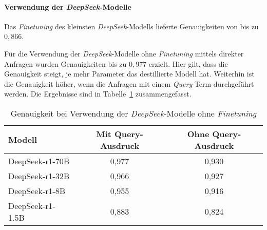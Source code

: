\paragraph{Verwendung der \textit{DeepSeek}-Modelle}
Das \textit{Finetuning} des kleinsten \textit{DeepSeek}-Modells lieferte Genauigkeiten von bis zu $0,866$.

Für die Verwendung der \textit{DeepSeek}-Modelle ohne \textit{Finetuning} mittels direkter Anfragen wurden Genauigkeiten bis zu $0,977$ erzielt.
Hier gilt, dass die Genauigkeit steigt, je mehr Parameter das destillierte Modell hat.
Weiterhin ist die Genauigkeit höher, wenn die Anfragen mit einem \textit{Query}-Term durchgeführt werden.
Die Ergebnisse sind in Tabelle~\ref{tab:deepseek-results} zusammengefasst.
\begin{table}
    \center
    \begin{tabular}{lcc}
        \toprule
        Modell           & Mit Query-Ausdruck & Ohne Query-Ausdruck \\
        \midrule
        DeepSeek-r1-70B  & 0,977                           &  0,930                         \\
        DeepSeek-r1-32B  & 0,966                           &  0,927                         \\
        DeepSeek-r1-8B   & 0,955                           &  0,916                         \\
        DeepSeek-r1-1.5B & 0,883                           &  0,824                         \\
        \bottomrule
    \end{tabular}
    \caption{Genauigkeit bei Verwendung der \textit{DeepSeek}-Modelle ohne \textit{Finetuning}}
    \label{tab:deepseek-results}
\end{table}
